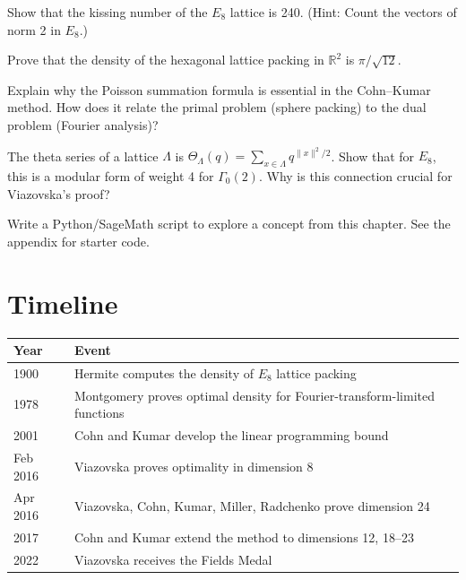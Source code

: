 \begin{exercise}[Basic]
Show that the kissing number of the $E_8$ lattice is 240. (Hint: Count the vectors of norm 2 in $E_8$.) \cite{conway1999}
\end{exercise}

\begin{exercise}[Intermediate]
Prove that the density of the hexagonal lattice packing in $\mathbb{R}^2$ is $\pi/\sqrt{12}$. \cite{thue1910}
\end{exercise}

\begin{exercise}[Challenge]
Explain why the Poisson summation formula is essential in the Cohn--Kumar method. How does it relate the primal problem (sphere packing) to the dual problem (Fourier analysis)? \cite{cohn2003}
\end{exercise}

\begin{exercise}
The theta series of a lattice $\Lambda$ is $\Theta_\Lambda(q) = \sum_{x \in \Lambda} q^{\|x\|^2/2}$. Show that for $E_8$, this is a modular form of weight 4 for $\Gamma_0(2)$. Why is this connection crucial for Viazovska's proof? \cite{viazovska2017}
\end{exercise}


\begin{exercise}[Computational]
Write a Python/SageMath script to explore a concept from this chapter. See the appendix for starter code.
\end{exercise}

\section{Timeline}

\begin{tabularx}{\linewidth}{lX}
\toprule
\textbf{Year} & \textbf{Event} \\ \midrule
1900 & Hermite computes the density of $E_8$ lattice packing \\ 
1978 & Montgomery proves optimal density for Fourier-transform-limited functions \cite{montgomery1978} \\ 
2001 & Cohn and Kumar develop the linear programming bound \cite{cohn2003} \\ 
Feb 2016 & Viazovska proves optimality in dimension 8 \cite{viazovska2017} \\ 
Apr 2016 & Viazovska, Cohn, Kumar, Miller, Radchenko prove dimension 24 \cite{cohn2017} \\ 
2017 & Cohn and Kumar extend the method to dimensions 12, 18--23 \cite{cohn2017b} \\ 
2022 & Viazovska receives the Fields Medal \\ \bottomrule
\end{tabularx}

